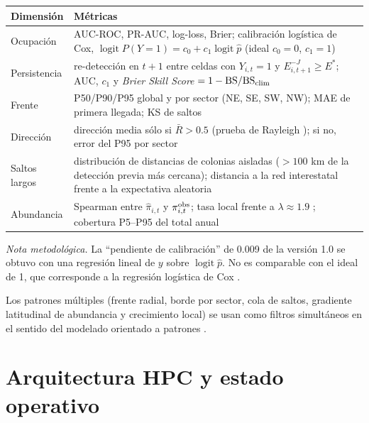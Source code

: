 \documentclass[11pt,letterpaper]{article}
\newcommand{\logit}{\operatorname{logit}}
\begin{document}
\begin{center}\small
\begin{tabularx}{\textwidth}{@{}p{3.1cm}Y@{}}\toprule
Dimensión & Métricas\\\midrule
Ocupación & AUC-ROC, PR-AUC, log-loss, Brier; calibración logística de Cox, $\logit P(Y=1)=c_0+c_1\logit\hat p$ (ideal $c_0=0$, $c_1=1$)\\
Persistencia & re-detección en $t+1$ entre celdas con $Y_{i,t}=1$ y $E^{-J}_{i,t+1}\ge E^\ast$; AUC, $c_1$ y \emph{Brier Skill Score} $=1-\mathrm{BS}/\mathrm{BS}_{\rm clim}$\\
Frente & P50/P90/P95 global y por sector (NE, SE, SW, NW); MAE de primera llegada; KS de saltos\\
Dirección & dirección media sólo si $\bar R>0.5$ (prueba de Rayleigh \cite{fisher1993}); si no, error del P95 por sector\\
Saltos largos & distribución de distancias de colonias aisladas ($>100$ km de la detección previa más cercana); distancia a la red interestatal frente a la expectativa aleatoria\\
Abundancia & Spearman entre $\hat\pi_{i,t}$ y $\pi^{\rm obs}_{i,t}$; tasa local frente a $\lambda\approx1.9$ \cite{pemberton2025}; cobertura P5--P95 del total anual\\
\bottomrule\end{tabularx}\end{center}
\textit{Nota metodológica.} La ``pendiente de calibración'' de 0.009 de la versión 1.0 se obtuvo con una regresión lineal de $y$ sobre $\logit\hat p$. No es comparable con el ideal de 1, que corresponde a la regresión logística de Cox \cite{cox1958}.

Los patrones múltiples (frente radial, borde por sector, cola de saltos, gradiente latitudinal de abundancia y crecimiento local) se usan como filtros simultáneos en el sentido del modelado orientado a patrones \cite{grimm2005}.

\section{Arquitectura HPC y estado operativo}
\label{sec:hpc}
\end{document}
